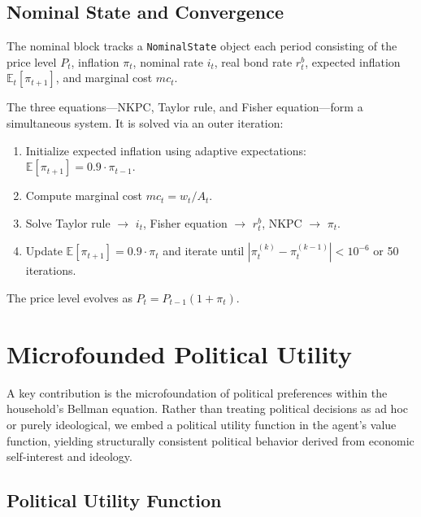 \documentclass[12pt]{article}
\newcommand{\E}{\mathbb{E}}
\begin{document}
\subsection{Nominal State and Convergence}

The nominal block tracks a \texttt{NominalState} object each period consisting of the price level $P_t$, inflation $\pi_t$, nominal rate $i_t$, real bond rate $r^b_t$, expected inflation $\E_t[\pi_{t+1}]$, and marginal cost $mc_t$.

The three equations---NKPC, Taylor rule, and Fisher equation---form a simultaneous system. It is solved via an outer iteration:
\begin{enumerate}
  \item Initialize expected inflation using adaptive expectations: $\E[\pi_{t+1}] = 0.9 \cdot \pi_{t-1}$.
  \item Compute marginal cost $mc_t = w_t / A_t$.
  \item Solve Taylor rule $\to$ $i_t$, Fisher equation $\to$ $r^b_t$, NKPC $\to$ $\pi_t$.
  \item Update $\E[\pi_{t+1}] = 0.9 \cdot \pi_t$ and iterate until $|\pi_t^{(k)} - \pi_t^{(k-1)}| < 10^{-6}$ or 50 iterations.
\end{enumerate}

The price level evolves as $P_t = P_{t-1}(1 + \pi_t)$.


\section{Microfounded Political Utility}\label{sec:political_utility}

A key contribution is the microfoundation of political preferences within the household's Bellman equation. Rather than treating political decisions as ad hoc or purely ideological, we embed a political utility function in the agent's value function, yielding structurally consistent political behavior derived from economic self-interest and ideology.

\subsection{Political Utility Function}
\end{document}
